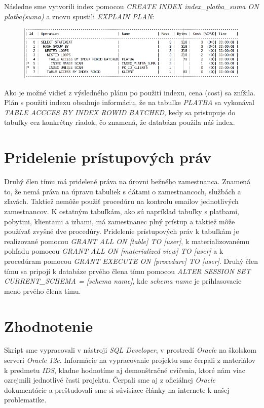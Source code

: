 \documentclass[a4paper,11pt,titlepage]{article}[11.3.2016]
\begin{document}
\noindent
Následne sme vytvorili index pomocou \textit{CREATE INDEX index\_platba\_suma ON platba(suma)} a znovu spustili \textit{EXPLAIN PLAN}:

\begin{center}
\begin{figure}[h]
    \includegraphics[scale=0.7]{po.png}
\end{figure}
\end{center}

\noindent
Ako je možné vidieť z výsledného plánu po použití indexu, cena (cost) sa znížila. Plán s použití indexu obsahuje informáciu, že na tabuľke \textit{PLATBA} sa vykonával \textit{TABLE ACCCES BY INDEX ROWID BATCHED}, kedy sa pristupuje do tabuľky cez konkrétny riadok, čo znamená, že databáza použila náš index.

\section{Pridelenie prístupových práv}
Druhý člen tímu má pridelené práva na úrovni bežného zamestnanca. Znamená to, že nemá práva na úpravu tabuliek s dátami o zamestnancoch, službách a zľavách. Taktiež nemôže použiť procedúru na kontrolu emailov jednotlivých zamestnancov. K ostatným tabuľkám, ako sú napríklad tabuľky s platbami, pobytmi, klientami a izbami, má zamestnanec plný prístup a taktiež môže používať zvyšné dve procedúry.
Pridelenie prístupových práv k tabuľkám je realizované pomocou \textit{GRANT ALL ON [table] TO [user]}, k materializovanému pohľadu pomocou \textit{GRANT ALL ON [materialized view] TO [user]} a k procedúram pomocou \textit{GRANT EXECUTE ON [procedure] TO [user]}. Druhý člen tímu sa pripojí k databáze prvého člena tímu pomocou \textit{ALTER SESSION SET CURRENT\_SCHEMA = [schema name]}, kde \textit{schema name} je prihlasovacie meno prvého člena tímu. 

\section{Zhodnotenie}

Skript sme vypracovali v nástroji \textit{SQL Developer}, v prostredí \textit{Oracle} na školskom serveri \textit{Oracle 12c}. Informácie na vypracovanie projektu sme čerpali z materiálov k predmetu \textit{IDS}, kladne hodnotíme aj demonštračné cvičenia, ktoré nám viac ozrejmili jednotlivé časti projektu. Čerpali sme aj z oficiálnej \textit{Oracle} dokumentácie a preštudovali sme si súvisiace články na internete k našej problematike.
\end{document}
